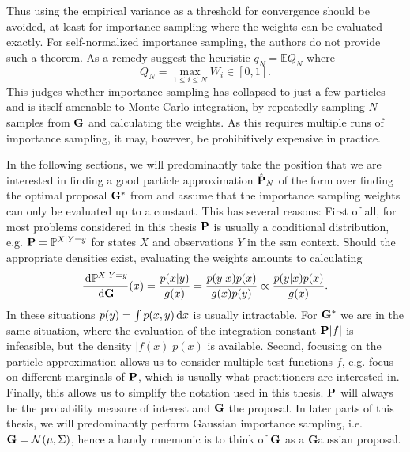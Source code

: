 Thus using the empirical variance as a threshold for convergence should be avoided, at least for importance sampling where the weights can be evaluated exactly. For self-normalized importance sampling, the authors do not provide such a theorem. As a remedy \citep{Chatterjee2018Sample} suggest the heuristic $q_{N} = \mathbb E Q_{N}$ where
$$
Q_{N} = \max_{1\leq i\leq N} W_{i} \in [0, 1].
$$
This judges whether importance sampling has collapsed to just a few particles and is itself amenable to Monte-Carlo integration, by repeatedly sampling $N$ samples from $\G$ and calculating the weights. 
As this requires multiple runs of importance sampling, it may, however, be prohibitively expensive in practice.

In the following sections, we will predominantly take the position that we are interested in finding a good particle approximation $\hat\P_{N}$ of the form  over finding the optimal proposal $\G^{\ast}$ from  and assume that the importance sampling weights can only be evaluated up to a constant. 
This has several reasons: First of all, for most problems considered in this thesis $\P$ is usually a conditional distribution, e.g. $\P = \mathbb P^{X|Y=y}$ for states $X$ and observations $Y$ in the \acrshort{ssm} context. Should the appropriate densities exist, evaluating the weights amounts to calculating 
$$
\rnd{\mathbb P^{X| Y= y}}{\G}(x) = \frac{p(x|y)}{g(x)} = \frac{p(y|x)p(x)}{g(x)p(y)} \propto \frac{p(y|x)p(x)}{g(x)}.
$$
In these situations $p(y) = \int p(x,y)\d x$ is usually intractable. For $\G^{\ast}$ we are in the same situation, where the evaluation of the integration constant $\P \lvert f \rvert$ is infeasible, but the density $\lvert f(x)\rvert p(x)$ is available.
Second, focusing on the particle approximation allows us to consider multiple test functions $f$, e.g. focus on different marginals of $\P$, which is usually what practitioners are interested in. 
Finally, this allows us to simplify the notation used in this thesis. $\P$ will always be the probability measure of interest and $\G$ the proposal. In later parts of this thesis, we will predominantly perform Gaussian importance sampling, i.e. $\G = \mathcal N(\mu, \Sigma)$, hence a handy mnemonic is to think of $\G$ as a \textbf{G}aussian proposal.

